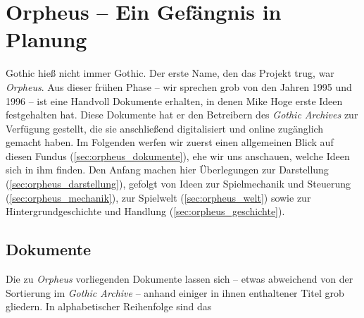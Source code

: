 \documentclass[a5paper,pagesize,numbers=noenddot]{scrbook}
\begin{document}
\chapter{Orpheus -- Ein Gefängnis in Planung}\label{ch:orpheus}
Gothic hieß nicht immer Gothic.
Der erste Name, den das Projekt trug, war \textit{Orpheus}. %
Aus dieser frühen Phase -- wir sprechen grob von den Jahren 1995 und 1996 -- ist eine Handvoll Dokumente erhalten, in denen Mike Hoge erste Ideen festgehalten hat.
Diese Dokumente hat er den Betreibern des \textit{Gothic Archives} zur Verfügung gestellt, die sie anschließend digitalisiert und online zugänglich gemacht haben.\autocite[Vgl.][]{archive_orpheus_2024}
Im Folgenden werfen wir zuerst einen allgemeinen Blick auf diesen Fundus (\autoref{sec:orpheus_dokumente}), ehe wir uns anschauen, welche Ideen sich in ihm finden.
Den Anfang machen hier Überlegungen zur Darstellung (\autoref{sec:orpheus_darstellung}), gefolgt von Ideen zur Spielmechanik und Steuerung (\autoref{sec:orpheus_mechanik}), zur Spielwelt (\autoref{sec:orpheus_welt}) sowie zur Hintergrundgeschichte und Handlung (\autoref{sec:orpheus_geschichte}).


\section{Dokumente}\label{sec:orpheus_dokumente}
Die zu \textit{Orpheus} vorliegenden Dokumente lassen sich -- etwas abweichend von der Sortierung im \textit{Gothic Archive} -- anhand einiger in ihnen enthaltener Titel grob gliedern. %
In alphabetischer Reihenfolge sind das
\end{document}
